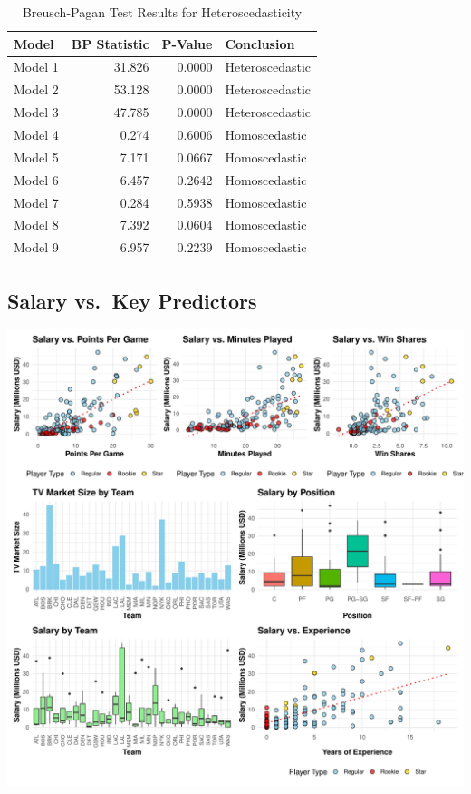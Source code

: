 \documentclass[
  11pt,
]{article}
\begin{document}
\begin{table}[!h]
\centering
\caption{\label{tab:bp-test}Breusch-Pagan Test Results for Heteroscedasticity}
\centering
\begin{tabular}[t]{lrrl}
\toprule
Model & BP Statistic & P-Value & Conclusion\\
\midrule
Model 1 & 31.826 & 0.0000 & Heteroscedastic\\
Model 2 & 53.128 & 0.0000 & Heteroscedastic\\
Model 3 & 47.785 & 0.0000 & Heteroscedastic\\
Model 4 & 0.274 & 0.6006 & Homoscedastic\\
Model 5 & 7.171 & 0.0667 & Homoscedastic\\
\addlinespace
Model 6 & 6.457 & 0.2642 & Homoscedastic\\
Model 7 & 0.284 & 0.5938 & Homoscedastic\\
Model 8 & 7.392 & 0.0604 & Homoscedastic\\
Model 9 & 6.957 & 0.2239 & Homoscedastic\\
\bottomrule
\end{tabular}
\end{table}
\FloatBarrier

\hypertarget{fig:appendix-salary-predictors}{%
\subsection{Salary vs.~Key Predictors}\label{fig:appendix-salary-predictors}}

\includegraphics{lab2_report_short_files/figure-latex/salary-predictors-1.pdf}
\FloatBarrier
\newpage
\end{document}
